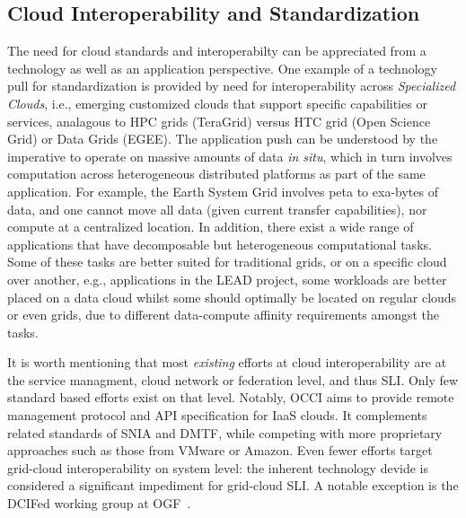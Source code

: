 \documentclass[10pt,conference,final,letterpaper,twoside,twocolumn,]{IEEEtran}
\newcommand{\I}[1]{\textit{#1}}
\begin{document}
 \subsection*{Cloud Interoperability and Standardization}

 The need for cloud standards and interoperabilty can be appreciated
 from a technology as well as an application perspective. One example
 of a technology pull for standardization is provided by need for
 interoperability across {\it Specialized Clouds}, i.e., emerging
 customized clouds that support specific capabilities or services,
 analagous to HPC grids (TeraGrid) versus HTC grid (Open Science Grid)
 or Data Grids (EGEE).  The application push can be understood by the
 imperative to operate on massive amounts of data {\it in situ}, which
 in turn involves computation across heterogeneous distributed
 platforms as part of the same application.  For example, the Earth
 System Grid involves peta to exa-bytes of data, and one cannot move
 all data (given current transfer capabilities), nor compute at a
 centralized location.  In addition, there exist a wide range of
 applications that have decomposable but heterogeneous computational
 tasks.  Some of these tasks are better suited for traditional grids,
 or on a specific cloud over another, e.g., applications in the LEAD
 project, some workloads are better placed on a data cloud whilst some
 should optimally be located on regular clouds or even grids, due to
 different data-compute affinity requirements amongst the tasks. 

 It is worth mentioning that most \I{existing} efforts at cloud
 interoperability are at the service managment, cloud network or
 federation level, and thus SLI.  Only few standard based efforts
 exist on that level.  Notably, OCCI aims to provide remote management
 protocol and API specification for IaaS clouds.  It complements
 related standards of SNIA and DMTF, while competing with more
 proprietary approaches such as those from VMware or Amazon.  Even
 fewer efforts target grid-cloud interoperability on system level: the
 inherent technology devide is considered a significant impediment for
 grid-cloud SLI.  A notable exception is the DCIFed working group at
 OGF~\cite{dcifed-www}.
 
\end{document}
